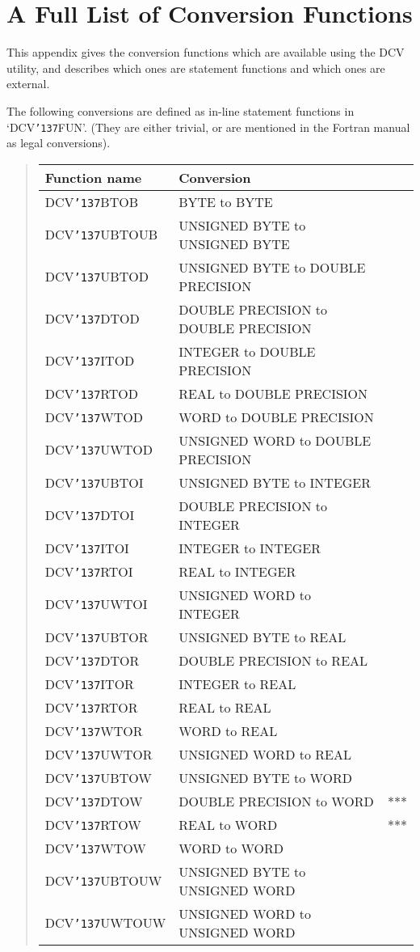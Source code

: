 \documentclass[twoside,11pt]{article}
\renewcommand{\_}{{\tt\char'137}}     %
\newcommand{\xlabel}[1]{}
\begin{document}
\newpage

\section{\xlabel{ap_b}A Full List of Conversion Functions\label{ap_b}}

This appendix gives the conversion functions which are available using
the DCV utility, and describes which ones are statement functions and
which ones are external.

The following conversions are defined as in-line statement functions in
`DCV\_FUN'. (They are either trivial, or are mentioned in the Fortran
manual as legal conversions).
\begin{quote}
\begin{tabular}{lll}
{\bf Function name} & \bf {Conversion} \\
\hline
DCV\_BTOB   &BYTE to BYTE \\
DCV\_UBTOUB &UNSIGNED BYTE to UNSIGNED BYTE \\
DCV\_UBTOD  &UNSIGNED BYTE to DOUBLE PRECISION \\
DCV\_DTOD   &DOUBLE PRECISION to DOUBLE PRECISION \\
DCV\_ITOD   &INTEGER to DOUBLE PRECISION \\
DCV\_RTOD   &REAL to DOUBLE PRECISION \\
DCV\_WTOD   &WORD to DOUBLE PRECISION \\
DCV\_UWTOD  &UNSIGNED WORD to DOUBLE PRECISION \\
DCV\_UBTOI  &UNSIGNED BYTE to INTEGER \\
DCV\_DTOI   &DOUBLE PRECISION to INTEGER \\
DCV\_ITOI   &INTEGER to INTEGER \\
DCV\_RTOI   &REAL to INTEGER \\
DCV\_UWTOI  &UNSIGNED WORD to INTEGER \\
DCV\_UBTOR  &UNSIGNED BYTE to REAL \\
DCV\_DTOR   &DOUBLE PRECISION to REAL \\
DCV\_ITOR   &INTEGER to REAL \\
DCV\_RTOR   &REAL to REAL \\
DCV\_WTOR   &WORD to REAL \\
DCV\_UWTOR  &UNSIGNED WORD to REAL \\
DCV\_UBTOW  &UNSIGNED BYTE to WORD \\
DCV\_DTOW   &DOUBLE PRECISION to WORD       &*** \\
DCV\_RTOW   &REAL to WORD                   &*** \\
DCV\_WTOW   &WORD to WORD \\
DCV\_UBTOUW &UNSIGNED BYTE to UNSIGNED WORD \\
DCV\_UWTOUW &UNSIGNED WORD to UNSIGNED WORD \\
\end{tabular}
\end{quote}
\end{document}
